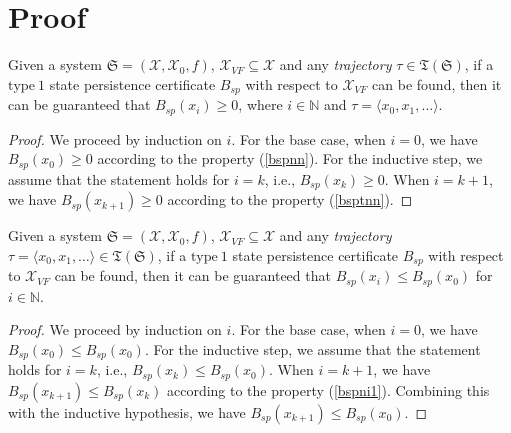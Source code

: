 \documentclass[acmlarge]{acmart}
\begin{document}
\section{Proof}
\begin{lemma}
  \label{bspnnlemma0}
  Given a system $\mathfrak{S}=(\mathcal{X}, \mathcal{X}_0, f)$, $\mathcal{X}_{VF} \subseteq \mathcal{X}$ and any \emph{trajectory} $\tau \in \mathfrak{T}(\mathfrak{S})$, 
  if a $\mathrm{type~1}$ state persistence certificate $B_{sp}$ with respect to $\mathcal{X}_{VF}$ can be found, 
  then it can be guaranteed that $B_{sp}(x_i) \geq 0$, where $i \in \mathbb{N}$ and $\tau = \langle x_0, x_1, \dots \rangle$.
\end{lemma}
\begin{proof}
  We proceed by induction on $i$. 
  For the base case, when $i = 0$, we have $B_{sp}(x_0) \geq 0$ according to the property (\ref{bspnn}).
  For the inductive step, we assume that the statement holds for $i = k$, i.e., $B_{sp}(x_k) \geq 0$. 
  When $i = k + 1$, we have $B_{sp}(x_{k+1}) \geq 0$ according to the property (\ref{bsptnn}).
\end{proof}
\begin{lemma}
  \label{state-persistence-lemma-b0-top}
  Given a system $\mathfrak{S}=(\mathcal{X}, \mathcal{X}_0, f)$, $\mathcal{X}_{VF} \subseteq \mathcal{X}$ and any \emph{trajectory} $\tau = \langle x_0, x_1, \dots \rangle \in \mathfrak{T}(\mathfrak{S})$, 
  if a $\mathrm{type~1}$ state persistence certificate $B_{sp}$ with respect to $\mathcal{X}_{VF}$ can be found, 
  then it can be guaranteed that $B_{sp}(x_i) \leq B_{sp}(x_0)$ for $i \in \mathbb{N}$.
\end{lemma}
\begin{proof}
  We proceed by induction on $i$.
  For the base case, when $i = 0$, we have $B_{sp}(x_0) \leq B_{sp}(x_0)$.
  For the inductive step, we assume that the statement holds for $i = k$, i.e., $B_{sp}(x_k) \leq B_{sp}(x_0)$.
  When $i = k+1$, we have $B_{sp}(x_{k+1}) \leq B_{sp}(x_k)$ according to the property (\ref{bspni1}). Combining this with the inductive hypothesis, we have $B_{sp}(x_{k+1}) \leq B_{sp}(x_0)$.
\end{proof}
\end{document}
